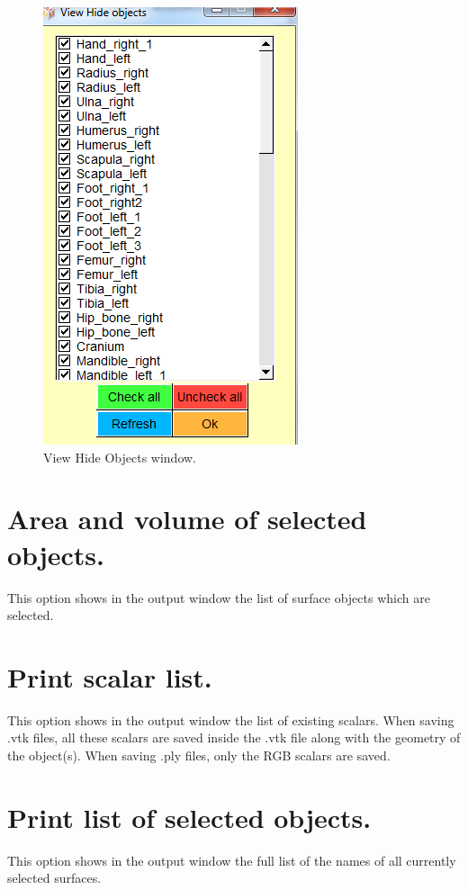\begin{figure}
  \centering
  \includegraphics[scale=0.7]{images/Show/View_hide_objects_window.png} 
	\caption{View Hide Objects window.}
\label{view_hide_objects}
 
\end{figure}



\section{Area and volume of selected objects.}
This option shows in the output window the list of surface objects which are selected.

\section{Print scalar list.}
This option shows in the output window the list of existing scalars. When saving .vtk files, all these
scalars are saved inside the .vtk file along with the geometry of the object(s). When saving .ply files,
only the RGB scalars are saved.

\section{Print list of selected objects.}
This option shows in the output window the full list of the names of all currently selected surfaces.
